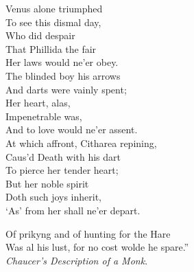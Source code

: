 \begin{dcverse}
\begin{patverse}
Venus alone triumphed\\
To see this dismal day,\\
Who did despair\\
That Phillida the fair\\
Her laws would ne’er obey.\\
The blinded boy his arrows\\
And darts were vainly spent;\\
Her heart, alas,\\
Impenetrable was,\\
And to love would ne’er assent.\\
At which affront, Citharea repining,\\
Caus’d Death with his dart\\
To pierce her tender heart;\\
But her noble spirit\\
Doth such joys inherit,\\
‘As’ from her shall ne’er depart.
\end{patverse}
\end{dcverse}


\settowidth{\versewidth}{Was al his lust, for no cost wolde he spare.”}
\begin{scverse}
Of prikyng and of hunting for the Hare\\
Was al his lust, for no cost wolde he spare.”\\
\attribution \textit{Chaucer’s Description of a Monk}.
\end{scverse}

